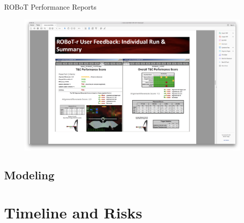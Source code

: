 \documentclass[10pt]{beamer}
\begin{document}
\begin{frame}[fragile]{ROBoT Performance Reports}
\begin{figure}
  \begin{center}
    \includegraphics[trim={13cm 5cm 22cm 15.5cm},clip,width=\linewidth]{../img/Screen_Shot_2018-07-26_at_1.43.07_PM.png}
  \end{center}
\end{figure}
\end{frame}


\subsection{Modeling}

\section{Timeline and Risks}
\end{document}
